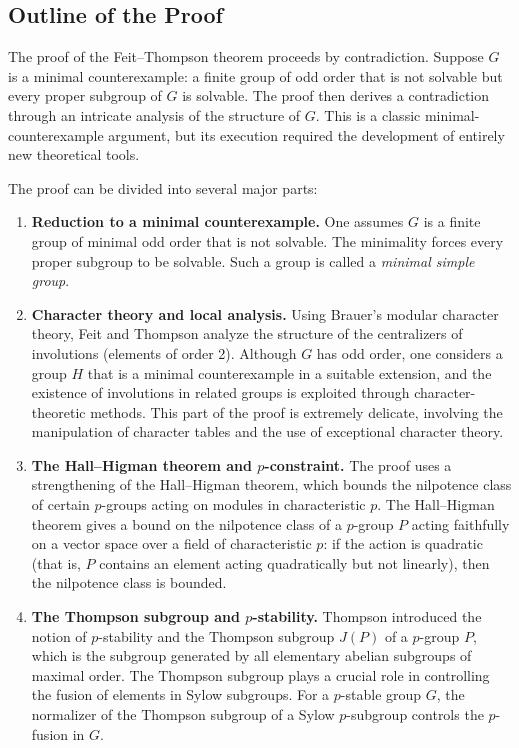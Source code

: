 \subsection{Outline of the Proof}

The proof of the Feit--Thompson theorem proceeds by contradiction. Suppose \(G\) is a minimal counterexample: a finite group of odd order that is not solvable but every proper subgroup of \(G\) is solvable. The proof then derives a contradiction through an intricate analysis of the structure of \(G\). This is a classic minimal-counterexample argument, but its execution required the development of entirely new theoretical tools.

The proof can be divided into several major parts:

\begin{enumerate}
\item \textbf{Reduction to a minimal counterexample.} One assumes \(G\) is a finite group of minimal odd order that is not solvable. The minimality forces every proper subgroup to be solvable. Such a group is called a \textit{minimal simple group}.

\item \textbf{Character theory and local analysis.} Using Brauer's modular character theory, Feit and Thompson analyze the structure of the centralizers of involutions (elements of order 2). Although \(G\) has odd order, one considers a group \(H\) that is a minimal counterexample in a suitable extension, and the existence of involutions in related groups is exploited through character-theoretic methods. This part of the proof is extremely delicate, involving the manipulation of character tables and the use of exceptional character theory.

\item \textbf{The Hall--Higman theorem and \(p\)-constraint.} The proof uses a strengthening of the Hall--Higman theorem, which bounds the nilpotence class of certain \(p\)-groups acting on modules in characteristic \(p\). The Hall--Higman theorem gives a bound on the nilpotence class of a \(p\)-group \(P\) acting faithfully on a vector space over a field of characteristic \(p\): if the action is quadratic (that is, \(P\) contains an element acting quadratically but not linearly), then the nilpotence class is bounded.

\item \textbf{The Thompson subgroup and \(p\)-stability.} Thompson introduced the notion of \(p\)-stability and the Thompson subgroup \(J(P)\) of a \(p\)-group \(P\), which is the subgroup generated by all elementary abelian subgroups of maximal order. The Thompson subgroup plays a crucial role in controlling the fusion of elements in Sylow subgroups. For a \(p\)-stable group \(G\), the normalizer of the Thompson subgroup of a Sylow \(p\)-subgroup controls the \(p\)-fusion in \(G\).


\end{enumerate}
